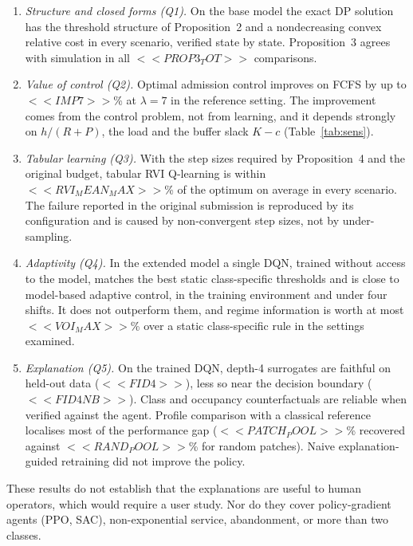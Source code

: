\begin{enumerate}
\item \emph{Structure and closed forms (Q1).} On the base model the exact DP solution has the threshold structure of Proposition~2 and a nondecreasing convex relative cost in every scenario, verified state by state. Proposition~3 agrees with simulation in all $<<PROP3_TOT>>$ comparisons.
\item \emph{Value of control (Q2).} Optimal admission control improves on FCFS by up to $<<IMP7>>$\% at $\lambda=7$ in the reference setting. The improvement comes from the control problem, not from learning, and it depends strongly on $h/(R+P)$, the load and the buffer slack $K-c$ (Table~\ref{tab:sens}).
\item \emph{Tabular learning (Q3).} With the step sizes required by Proposition~4 and the original budget, tabular RVI Q-learning is within $<<RVI_MEAN_MAX>>$\% of the optimum on average in every scenario. The failure reported in the original submission is reproduced by its configuration and is caused by non-convergent step sizes, not by under-sampling.
\item \emph{Adaptivity (Q4).} In the extended model a single DQN, trained without access to the model, matches the best static class-specific thresholds and is close to model-based adaptive control, in the training environment and under four shifts. It does not outperform them, and regime information is worth at most $<<VOI_MAX>>$\% over a static class-specific rule in the settings examined.
\item \emph{Explanation (Q5).} On the trained DQN, depth-4 surrogates are faithful on held-out data ($<<FID4>>$), less so near the decision boundary ($<<FID4NB>>$). Class and occupancy counterfactuals are reliable when verified against the agent. Profile comparison with a classical reference localises most of the performance gap ($<<PATCH_POOL>>$\% recovered against $<<RAND_POOL>>$\% for random patches). Naive explanation-guided retraining did not improve the policy.
\end{enumerate}
These results do not establish that the explanations are useful to human operators, which would require a user study. Nor do they cover policy-gradient agents (PPO, SAC), non-exponential service, abandonment, or more than two classes.
